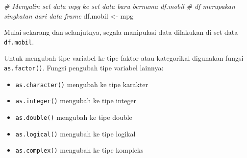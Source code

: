 \documentclass[openany]{book}
\newenvironment{Shaded}{\begin{snugshade}}{\end{snugshade}}
\newcommand{\KeywordTok}[1]{\textcolor[rgb]{0.13,0.29,0.53}{\textbf{#1}}}
\newcommand{\StringTok}[1]{\textcolor[rgb]{0.31,0.60,0.02}{#1}}
\newcommand{\CommentTok}[1]{\textcolor[rgb]{0.56,0.35,0.01}{\textit{#1}}}
\newcommand{\OperatorTok}[1]{\textcolor[rgb]{0.81,0.36,0.00}{\textbf{#1}}}
\newcommand{\NormalTok}[1]{#1}
\providecommand{\tightlist}{%
  \setlength{\itemsep}{0pt}\setlength{\parskip}{0pt}}
\begin{document}
\begin{Shaded}
\begin{Highlighting}[]
\CommentTok{# Menyalin set data mpg ke set data baru bernama df.mobil}
\CommentTok{# df merupakan singkatan dari data frame}
\NormalTok{df.mobil <-}\StringTok{ }\NormalTok{mpg}
\end{Highlighting}
\end{Shaded}

Mulai sekarang dan selanjutnya, segala manipulasi data dilakukan di set
data \texttt{df.mobil}.

Untuk mengubah tipe variabel ke tipe faktor atau kategorikal digunakan
fungsi \texttt{as.factor()}. Fungsi pengubah tipe variabel lainnya:

\begin{itemize}
\tightlist
\item
  \texttt{as.character()} mengubah ke tipe karakter
\item
  \texttt{as.integer()} mengubah ke tipe integer
\item
  \texttt{as.double()} mengubah ke tipe double
\item
  \texttt{as.logical()} mengubah ke tipe logikal
\item
  \texttt{as.complex()} mengubah ke tipe kompleks
\end{itemize}

\begin{Shaded}
\end{Shaded}
\end{document}
